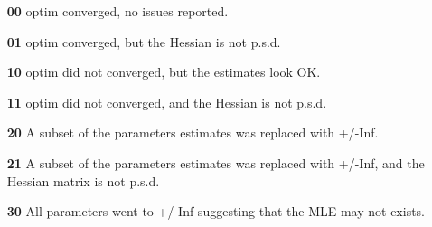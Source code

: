 \documentclass[review, nonatbib,doubleblind]{elsarticle/elsarticle}
\begin{document}
\begin{itemize}
\item[\textbf{00}] optim converged, no issues reported.
\item[\textbf{01}] optim converged, but the Hessian is not p.s.d.
\item[\textbf{10}] optim did not converged, but the estimates look OK.
\item[\textbf{11}] optim did not converged, and the Hessian is not p.s.d.
\item[\textbf{20}] A subset of the parameters estimates was replaced with +/-Inf.
\item[\textbf{21}] A subset of the parameters estimates was replaced with +/-Inf, and the Hessian matrix is not p.s.d.
\item[\textbf{30}] All parameters went to +/-Inf suggesting that the MLE may not exists.
\end{itemize}
\end{document}
